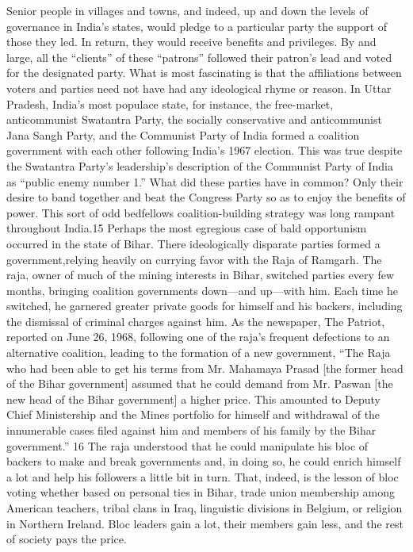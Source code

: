 \documentclass[10pt]{article}
\begin{document}
{\large Senior people in villages and towns, and indeed, up and down the levels
of governance in India's states, would pledge to a particular party the support
of those they led. In return, they would receive benefits and privileges. By and
large, all the ``clients'' of these ``patrons'' followed their patron's lead and
voted for the designated party. What is most fascinating is that the affiliations
between voters and parties need not have had any ideological rhyme or reason. In
Uttar Pradesh, India's most populace state, for instance, the free-market,
anticommunist Swatantra Party, the socially conservative and anticommunist Jana
Sangh Party, and the Communist Party of India formed a coalition government with
each other following India's 1967 election. This was true despite the Swatantra
Party's leadership's description of the Communist Party of India as ``public
enemy number 1.'' What did these parties have in common? Only their desire to
band together and beat the Congress Party so as to enjoy the benefits of power.
This sort of odd bedfellows coalition-building strategy was long rampant
throughout India.15 Perhaps the most egregious case of bald opportunism occurred
in the state of Bihar. There ideologically disparate parties formed a
government,relying heavily on currying favor with the Raja of Ramgarh. The raja,
owner of much of the mining interests in Bihar, switched parties every few
months, bringing coalition governments down---and up---with him. Each time he
switched, he garnered greater private goods for himself and his backers,
including the dismissal of criminal charges against him. As the newspaper, The
Patriot, reported on June 26, 1968, following one of the raja's frequent
defections to an alternative coalition, leading to the formation of a new
government, ``The Raja who had been able to get his terms from Mr. Mahamaya
Prasad [the former head of the Bihar government] assumed that he could demand
from Mr. Paswan [the new head of the Bihar government] a higher price. This
amounted to Deputy Chief Ministership and the Mines portfolio for himself and
withdrawal of the innumerable cases filed against him and members of his family
by the Bihar government.'' 16 The raja understood that he could manipulate his
bloc of backers to make and break governments and, in doing so, he could enrich
himself a lot and help his followers a little bit in turn. That, indeed, is the
lesson of bloc voting whether based on personal ties in Bihar, trade union
membership among American teachers, tribal clans in Iraq, linguistic divisions in
Belgium, or religion in Northern Ireland. Bloc leaders gain a lot, their members
gain less, and the rest of society pays the price.}
\end{document}
